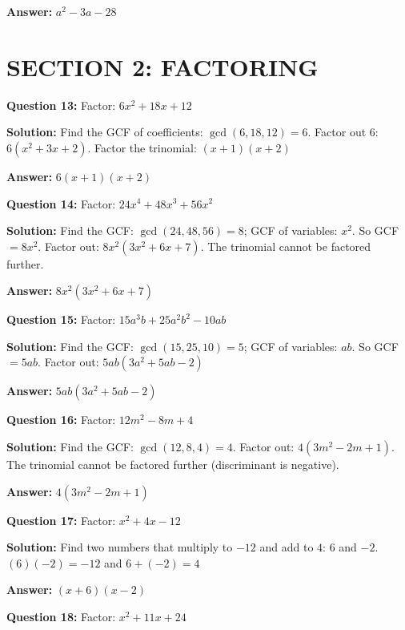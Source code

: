 \documentclass[12pt]{article}
\begin{document}
\textbf{Answer:} $\boxed{a^2 - 3a - 28}$

\hrulefill

\section*{SECTION 2: FACTORING}

\noindent
\textbf{Question 13:} Factor: $6x^2 + 18x + 12$

\textbf{Solution:} Find the GCF of coefficients: $\gcd(6, 18, 12) = 6$. Factor out 6: $6(x^2 + 3x + 2)$. Factor the trinomial: $(x + 1)(x + 2)$

\textbf{Answer:} $\boxed{6(x + 1)(x + 2)}$

\vspace{0.3cm}
\noindent
\textbf{Question 14:} Factor: $24x^4 + 48x^3 + 56x^2$

\textbf{Solution:} Find the GCF: $\gcd(24, 48, 56) = 8$; GCF of variables: $x^2$. So GCF $= 8x^2$. Factor out: $8x^2(3x^2 + 6x + 7)$. The trinomial cannot be factored further.

\textbf{Answer:} $\boxed{8x^2(3x^2 + 6x + 7)}$

\vspace{0.3cm}
\noindent
\textbf{Question 15:} Factor: $15a^3b + 25a^2b^2 - 10ab$

\textbf{Solution:} Find the GCF: $\gcd(15, 25, 10) = 5$; GCF of variables: $ab$. So GCF $= 5ab$. Factor out: $5ab(3a^2 + 5ab - 2)$

\textbf{Answer:} $\boxed{5ab(3a^2 + 5ab - 2)}$

\vspace{0.3cm}
\noindent
\textbf{Question 16:} Factor: $12m^2 - 8m + 4$

\textbf{Solution:} Find the GCF: $\gcd(12, 8, 4) = 4$. Factor out: $4(3m^2 - 2m + 1)$. The trinomial cannot be factored further (discriminant is negative).

\textbf{Answer:} $\boxed{4(3m^2 - 2m + 1)}$

\vspace{0.3cm}
\noindent
\textbf{Question 17:} Factor: $x^2 + 4x - 12$

\textbf{Solution:} Find two numbers that multiply to $-12$ and add to $4$: $6$ and $-2$. $(6)(-2) = -12$ and $6 + (-2) = 4$

\textbf{Answer:} $\boxed{(x + 6)(x - 2)}$

\vspace{0.3cm}
\noindent
\textbf{Question 18:} Factor: $x^2 + 11x + 24$
\end{document}
